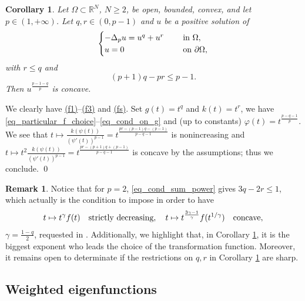\documentclass[11pt, reqno]{amsart}
\newtheorem{corollary}[lemma]{Corollary}
\theoremstyle{definition}
\newtheorem{remark}[lemma]{Remark}
\numberwithin{equation}{section}
\newcommand{\R}{\mathbb{R}}
\renewenvironment{proof}[1][\proofname]{\medskip \noindent {\bfseries #1. }}{\qed \bigskip}
\begin{document}
\begin{corollary}
\label{corol_sum_powers}
Let $\Omega \subset \R^N$, $N\geq 2$, be open, bounded, convex, and let $p\in (1,+\infty)$.
Let $q,r \in (0, p-1)$ and $u$ be a positive solution of 
$$\begin{cases}
-\Delta_p u = u^q + u^r & \quad \hbox{ in $\Omega$},\\ 
u =0 & \quad \hbox{ on $\partial \Omega$},
\end{cases}$$
with $r \leq q$ and 
\begin{equation}\label{eq_cond_sum_power}
(p+1)q - p r \leq p-1.
\end{equation}
Then $u^{\frac{p-1-q}{p}}$ is concave.
\end{corollary} 

\begin{proof}
We clearly have \hyperlink{(f1)}{\rm{(f1)}}--\hyperlink{(f3)}{\rm{(f3)}} and \hyperlink{(fs)}{\rm{(fs)}}.
Set $g(t)=t^q$ and $k(t)=t^r$, we have \eqref{eq_particular_f_choice}--\eqref{eq_cond_on_g} and (up to constants) $\varphi(t) = t^{\frac{p-q-1}{p}}$. 
We see that $t \mapsto \frac{k(\psi(t))}{(\psi'(t))^{p-1}} = t^{\frac{pr-(p-1)q-(p-1)}{p-q-1}}$ is nonincreasing and $t \mapsto t^2 \frac{k(\psi(t))}{(\psi'(t))^{p-1}}=t^{\frac{pr-(p+1)q+(p-1)}{p-q-1}}$ is concave by the assumptions; thus we conclude.
\end{proof}

\begin{remark}
Notice that for $p=2$, \eqref{eq_cond_sum_power} gives $3q - 2r \leq 1$, which actually is the condition to impose in order to have
\begin{equation}\label{eq_cond_extra_kenn}
 t \mapsto t^{\gamma} f(t) \quad \hbox{strictly decreasing}, \quad t \mapsto t^{\frac{3\gamma-1}{\gamma}} f(t^{1/\gamma}) \quad \hbox{concave},
 \end{equation}
$\gamma=\frac{1-q}{2}$, requested in \cite[Theorem 3.3]{Ken85}.
Additionally, we highlight that, in Corollary \ref{corol_sum_powers}, it is the biggest exponent who leads the choice of the transformation function. 
Moreover, it remains open to determinate if the restrictions on $q,r$ in Corollary \ref{corol_sum_powers} are sharp.
\end{remark}


\subsection{Weighted eigenfunctions}
\label{sec_eigen_phi_unbound}
\end{document}
